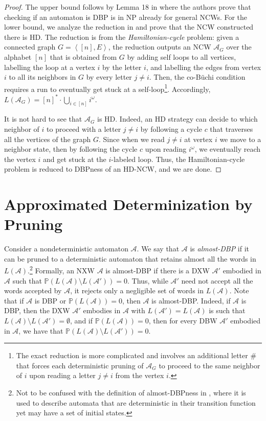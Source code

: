 \documentclass[10pt,a4paper]{amsart}
\theoremstyle{definition}
\numberwithin{equation}{section}
\newcommand{\buchi}{B\"uchi\xspace}
\newcommand{\A}{{\mathcal A}}
\newcommand{\zug}[1]{\left\langle #1 \right\rangle}
\renewcommand{\P}{\mathbb{P}}
\begin{document}
\begin{proof}
The upper bound follows by Lemma 18 in \cite{KM18} where the authors prove that checking if an automaton is DBP is in NP already for general NCWs.
For the lower bound, we analyze the reduction in \cite{KM18} and prove that the NCW constructed there is HD.
The reduction is from the \emph{Hamiltonian-cycle} problem: 
given a connected graph $G = \zug{[n], E}$, the reduction outputs an NCW $\A_G$ over the alphabet $[n]$
that is obtained from $G$ by adding self loops to all vertices, labelling the loop at a vertex $i$ by the letter $i$, and labelling the edges from vertex $i$ to all its neighbors in $G$ by every letter $j\neq i$. Then, the co-\buchi condition requires a run to eventually get stuck at a self-loop\footnote{The exact reduction is more complicated and involves an additional letter $\#$ that forces each deterministic pruning of $\A_G$ to proceed to the same neighbor of $i$ upon reading a letter $j\neq i$ from the vertex $i$.}. Accordingly, $L(\A_G) = [n]^*\cdot \bigcup_{i\in [n]} i^\omega$.

It is not hard to see that $\A_G$ is HD. Indeed, an HD strategy can decide to which neighbor of $i$ to proceed with a letter $j \neq i$ by following a cycle $c$ that traverses all the vertices of the graph $G$. Since when we read $j \neq i$ at vertex $i$ we move to a neighbor state, then by following the cycle $c$ upon reading $i^\omega$, we eventually reach the vertex $i$ and get stuck at the $i$-labeled loop. Thus, the Hamiltonian-cycle problem is reduced to DBPness of an HD-NCW, and we are done.
\end{proof}




\section{Approximated Determinization by Pruning}
\label{sec prob}

Consider a nondeterministic automaton $\A$. 
We say that $\A$ is {\em almost-DBP\/} if it can be pruned to a deterministic automaton that retains almost all the words in $L(\A)$.\footnote{Not to be confused with the definition of almost-DBPness in \cite{AKL10}, where it is used to describe automata that are deterministic in their transition function yet may have a set of initial states.}
Formally, an NXW $\A$ is almost-DBP if there is a DXW $\A'$ embodied in $\A$ such that $\P(L(\A)\setminus L(\A'))=0$. 
Thus, while $\A'$ need not accept all the words accepted by $\A$, it rejects only a negligible set of words in $L(\A)$. 
Note that if $\A$ is DBP or $\P(L(\A))=0$, then $\A$ is almost-DBP. Indeed, if $\A$ is DBP, then the DXW $\A'$ embodies in $\A$ with $L(\A')=L(\A)$ is such that $L(\A)\setminus L(\A')=\emptyset$, and if $\P(L(\A))=0$, then for every DBW $\A'$ embodied in $\A$, we have that $\P(L(\A)\setminus L(\A'))=0$. 
\end{document}
